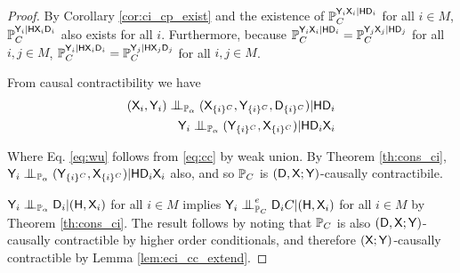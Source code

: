 \begin{proof}
By Corollary \ref{cor:ci_cp_exist} and the existence of $\mathbb{P}_C^{\mathsf{Y}_i\mathsf{X}_i|\mathsf{H}\mathsf{D}_i}$ for all $i\in M$, $\mathbb{P}_C^{\mathsf{Y}_i|\mathsf{H}\mathsf{X}_i\mathsf{D}_i}$ also exists for all $i$. Furthermore, because $\mathbb{P}_C^{\mathsf{Y}_i\mathsf{X}_i|\mathsf{H}\mathsf{D}_i}=\mathbb{P}_C^{\mathsf{Y}_j\mathsf{X}_j|\mathsf{H}\mathsf{D}_j}$ for all $i,j\in M$, $\mathbb{P}_C^{\mathsf{Y}_i|\mathsf{H}\mathsf{X}_i\mathsf{D}_i}=\mathbb{P}_C^{\mathsf{Y}_j|\mathsf{H}\mathsf{X}_j\mathsf{D}_j}$ for all $i,j\in M$.

From causal contractibility we have
\begin{align}
(\RV{X}_i,\RV{Y}_i)\CI_{\prob{P}_\alpha} (\RV{X}_{\{i\}^C},\RV{Y}_{\{i\}^C},\RV{D}_{\{i\}^C}) |\RV{H}\RV{D}_i\label{eq:cc}\\
\RV{Y}_i\CI_{\prob{P}_\alpha} (\RV{Y}_{\{i\}^C},\RV{X}_{\{i\}^C}) |\RV{H}\RV{D}_i\RV{X}_i\label{eq:wu}
\end{align}

Where Eq. \ref{eq:wu} follows from \ref{eq:cc} by weak union. By Theorem \ref{th:cons_ci}, $\RV{Y}_i\CI_{\prob{P}_\alpha} (\RV{Y}_{\{i\}^C},\RV{X}_{\{i\}^C}) |\RV{H}\RV{D}_i\RV{X}_i$ also, and so $\mathbb{P}_C$ is $(\mathsf{D},\mathsf{X};\mathsf{Y})$-causally contractibile. 

$\RV{Y}_i\CI_{\prob{P}_\alpha} \RV{D}_i |(\RV{H},\RV{X}_i)$ for all $i\in M$ implies $\RV{Y}_i\CI_{\prob{P}_C}^e \RV{D}_i C|(\RV{H},\RV{X}_i)$ for all $i\in M$ by Theorem \ref{th:cons_ci}. The result follows by noting that $\mathbb{P}_C$ is also $(\mathsf{D},\mathsf{X};\mathsf{Y})$-causally contractible by higher order conditionals, and therefore $(\mathsf{X};\mathsf{Y})$-causally contractible by Lemma \ref{lem:eci_cc_extend}.
\end{proof}